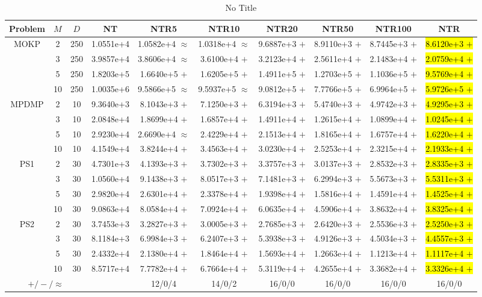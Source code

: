 \documentclass[journal]{IEEEtran}
\begin{document}
\begin{table*}[htbp]
\renewcommand{\arraystretch}{1.2}
\centering
\caption{No Title}
\begin{tabular}{cccccccccc}
\toprule
Problem&$M$&$D$&NT&NTR5&NTR10&NTR20&NTR50&NTR100&NTR\\
\midrule
\multirow{4}{*}{MOKP}&2&250&1.0551e+4&1.0582e+4 $\approx$&1.0318e+4 $\approx$&9.6887e+3 $+$&8.9110e+3 $+$&8.7445e+3 $+$&\hl{8.6120e+3 $+$}\\
&3&250&3.9857e+4&3.8606e+4 $\approx$&3.6100e+4 $+$&3.2123e+4 $+$&2.5611e+4 $+$&2.1483e+4 $+$&\hl{2.0759e+4 $+$}\\
&5&250&1.8203e+5&1.6640e+5 $+$&1.6205e+5 $+$&1.4911e+5 $+$&1.2703e+5 $+$&1.1036e+5 $+$&\hl{9.5769e+4 $+$}\\
&10&250&1.0035e+6&9.5866e+5 $\approx$&9.5937e+5 $\approx$&9.0812e+5 $+$&7.7766e+5 $+$&6.9964e+5 $+$&\hl{5.9726e+5 $+$}\\
\hline
\multirow{4}{*}{MPDMP}&2&10&9.3640e+3&8.1043e+3 $+$&7.1250e+3 $+$&6.3194e+3 $+$&5.4740e+3 $+$&4.9742e+3 $+$&\hl{4.9295e+3 $+$}\\
&3&10&2.0848e+4&1.8699e+4 $+$&1.6857e+4 $+$&1.4911e+4 $+$&1.2615e+4 $+$&1.0899e+4 $+$&\hl{1.0245e+4 $+$}\\
&5&10&2.9230e+4&2.6690e+4 $\approx$&2.4229e+4 $+$&2.1513e+4 $+$&1.8165e+4 $+$&1.6757e+4 $+$&\hl{1.6220e+4 $+$}\\
&10&10&4.1549e+4&3.8244e+4 $+$&3.4563e+4 $+$&3.0230e+4 $+$&2.5253e+4 $+$&2.3215e+4 $+$&\hl{2.1933e+4 $+$}\\
\hline
\multirow{4}{*}{PS1}&2&30&4.7301e+3&4.1393e+3 $+$&3.7302e+3 $+$&3.3757e+3 $+$&3.0137e+3 $+$&2.8532e+3 $+$&\hl{2.8335e+3 $+$}\\
&3&30&1.0560e+4&9.1438e+3 $+$&8.0517e+3 $+$&7.1481e+3 $+$&6.2994e+3 $+$&5.5673e+3 $+$&\hl{5.5311e+3 $+$}\\
&5&30&2.9820e+4&2.6301e+4 $+$&2.3378e+4 $+$&1.9398e+4 $+$&1.5816e+4 $+$&1.4591e+4 $+$&\hl{1.4525e+4 $+$}\\
&10&30&9.0863e+4&8.0584e+4 $+$&7.0924e+4 $+$&6.0635e+4 $+$&4.5906e+4 $+$&3.8632e+4 $+$&\hl{3.8325e+4 $+$}\\
\hline
\multirow{4}{*}{PS2}&2&30&3.7453e+3&3.2827e+3 $+$&3.0005e+3 $+$&2.7685e+3 $+$&2.6420e+3 $+$&2.5536e+3 $+$&\hl{2.5250e+3 $+$}\\
&3&30&8.1184e+3&6.9984e+3 $+$&6.2407e+3 $+$&5.3938e+3 $+$&4.9126e+3 $+$&4.5034e+3 $+$&\hl{4.4557e+3 $+$}\\
&5&30&2.4332e+4&2.1380e+4 $+$&1.8464e+4 $+$&1.5693e+4 $+$&1.2663e+4 $+$&1.1213e+4 $+$&\hl{1.1117e+4 $+$}\\
&10&30&8.5717e+4&7.7782e+4 $+$&6.7664e+4 $+$&5.3119e+4 $+$&4.2655e+4 $+$&3.3682e+4 $+$&\hl{3.3326e+4 $+$}\\
\hline
\multicolumn{3}{c}{$+/-/\approx$}&&12/0/4&14/0/2&16/0/0&16/0/0&16/0/0&16/0/0\\
\bottomrule
\end{tabular}
\label{No Label}
\end{table*}
\end{document}
